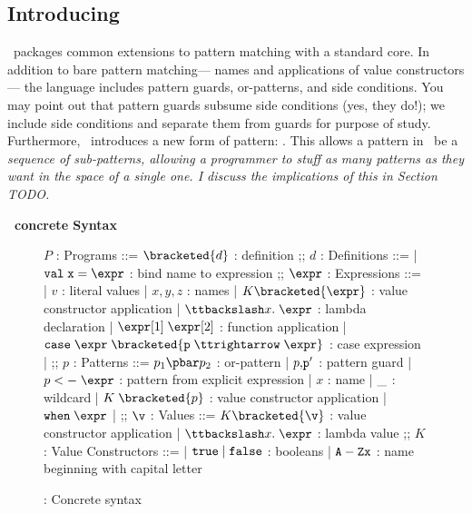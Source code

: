 \documentclass[manuscript,screen,review, 12pt, nonacm]{acmart}
\begin{document}
\subsection{Introducing \PPlus}

    \PPlus\ packages common extensions to pattern matching with a standard core.
    In addition to bare pattern matching— names and applications of value
    constructors— the language includes pattern guards, or-patterns, and side
    conditions. You may point out that pattern guards subsume side conditions
    (yes, they do!); we include side conditions and separate them from guards
    for purpose of study. Furthermore, \PPlus\ introduces a new form of pattern:
    \pcommap. This allows a pattern in \PPlus\ be a \it{sequence} of
    sub-patterns, allowing a programmer to stuff as many patterns as they want
    in the space of a single one. I discuss the implications of this in Section
    TODO.

    \bf{\PPlus\ concrete Syntax}

\begin{figure}
\begin{center}
\begin{bnf}
$P$ : \textsf{Programs} ::=
$\bracketed{d}$ : definition
;;
$d$ : \textsf{Definitions} ::=
| $\tt{val}\; x\; \tt{=}\; \expr$ : bind name to expression
;;
$\expr$ : Expressions ::= 
| $v$ : literal values 
| $x, y, z$ : names
| $K\bracketed{\expr}$ : value constructor application 
| $\ttbackslash x.\; \expr$ : lambda declaration  
| $\expr[1]\; \expr[2]$ : function application 
| $\tt{case}\; \expr\; \bracketed{p\; \ttrightarrow\; \expr}$ : case expression 
| \ttbraced{$\expr$}
;;
$p$ : \textsf{Patterns} ::= $p_{1}\pbar p_{2}$ : or-pattern
| $p \tt{,} p'$ : pattern guard 
| $p\; \tt{<-}\; \expr$ : pattern from explicit expression  
| $x$ : name 
| $\tt{\_}$ : wildcard 
| $K\; \bracketed{p}$ : value constructor application 
| $\tt{when}\; \expr$
| 
;;
$\v$ : Values ::= $K\bracketed{\v}$ : value constructor application 
| $\ttbackslash x.\; \expr$ : lambda value 
;;
$K$ : \textsf{Value Constructors} ::=
| $\tt{true}\; \vert\; \tt{false}$ : booleans
| $\tt{A-Z}x$ : name beginning with capital letter
\end{bnf}
\end{center}
\caption{\PPlus: Concrete syntax}
\end{figure}
\end{document}

